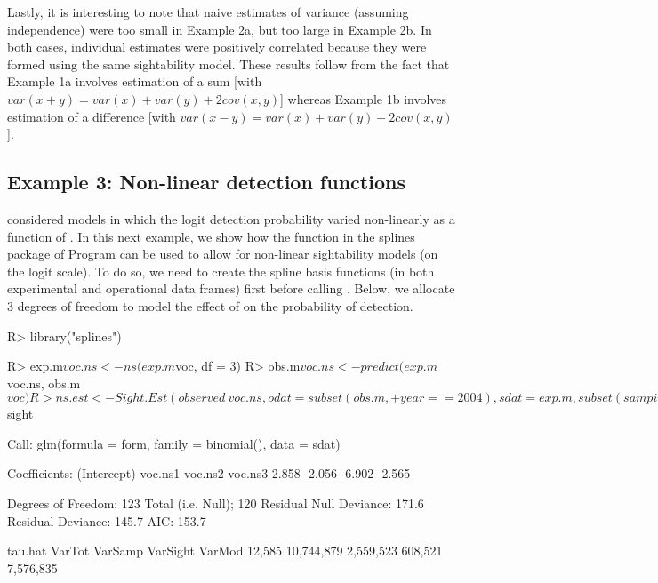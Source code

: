 \documentclass[nojss]{jss}
\begin{document}
Lastly, it is interesting to note that naive estimates of variance
(assuming independence) were too small in Example 2a, but too large
in Example 2b. In both cases, individual estimates were positively
correlated because they were formed using the same sightability
model.  These results follow from the fact that Example 1a involves
estimation of a sum [with $var(x+y) = var(x) + var(y) +2cov(x,y)$]
whereas Example 1b involves estimation of a difference [with
$var(x-y) = var(x)+var(y)-2cov(x,y)$].

\subsection{Example 3:  Non-linear detection functions}
\citet{GiudFieb2011} considered models in which the logit detection
probability varied non-linearly as a function of . In this
next example, we show how the  function in the splines
package of Program  \citep{RCDT2010} can be used to
allow for non-linear sightability models (on the logit scale). To do
so, we need to create the spline basis functions (in both
experimental and operational data frames) first before calling
. Below, we allocate 3 degrees of freedom to model
the effect of  on the probability of detection.
\begin{Schunk}
\begin{Sinput}
R> library("splines")
\end{Sinput}
\end{Schunk}

\begin{Schunk}
\begin{Sinput}
R> exp.m$voc.ns <- ns(exp.m$voc, df = 3)
R> obs.m$voc.ns <- predict(exp.m$voc.ns, obs.m$voc)
R> ns.est <- Sight.Est(observed ~ voc.ns, odat = subset(obs.m,
+      year == 2004), sdat = exp.m, subset(sampinfo.m,
+      year == 2004))
R> ns.est$sight
\end{Sinput}
\begin{Soutput}
Call:  glm(formula = form, family = binomial(), data = sdat)

Coefficients:
(Intercept)      voc.ns1      voc.ns2      voc.ns3
      2.858       -2.056       -6.902       -2.565

Degrees of Freedom: 123 Total (i.e. Null);  120 Residual
Null Deviance:      171.6
Residual Deviance: 145.7    AIC: 153.7
\end{Soutput}
\begin{Soutput}
   tau.hat     VarTot    VarSamp   VarSight     VarMod
    12,585 10,744,879  2,559,523    608,521  7,576,835
\end{Soutput}
\end{Schunk}
\end{document}
